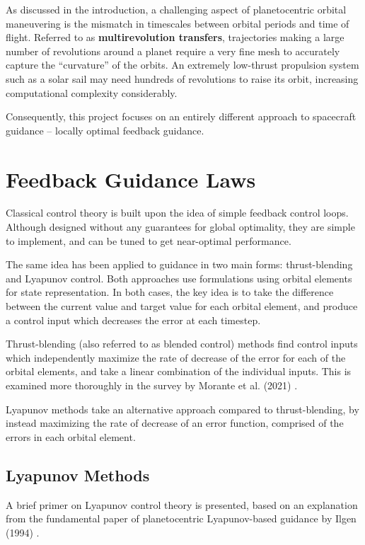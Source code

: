 As discussed in the introduction, a challenging aspect of planetocentric orbital maneuvering is the mismatch in timescales between orbital periods and time of flight. Referred to as \textbf{multirevolution transfers}, trajectories making a large number of revolutions around a planet require a very fine mesh to accurately capture the ``curvature'' of the orbits. An extremely low-thrust propulsion system such as a solar sail may need hundreds of revolutions to raise its orbit, increasing computational complexity considerably.

Consequently, this project focuses on an entirely different approach to spacecraft guidance -- locally optimal feedback guidance.

\section{Feedback Guidance Laws}
Classical control theory is built upon the idea of simple feedback control loops. Although designed without any guarantees for global optimality, they are simple to implement, and can be tuned to get near-optimal performance.

The same idea has been applied to guidance in two main forms: thrust-blending and Lyapunov control. Both approaches use formulations using orbital elements for state representation. In both cases, the key idea is to take the difference between the current value and target value for each orbital element, and produce a control input which decreases the error at each timestep.

Thrust-blending (also referred to as blended control) methods find control inputs which independently maximize the rate of decrease of the error for each of the orbital elements, and take a linear combination of the individual inputs. This is examined more thoroughly in the survey by Morante et al. (2021) \cite{morante2021survey}.

Lyapunov methods take an alternative approach compared to thrust-blending, by instead maximizing the rate of decrease of an error function, comprised of the errors in each orbital element.

\subsection{Lyapunov Methods}
A brief primer on Lyapunov control theory is presented, based on an explanation from the fundamental paper of planetocentric Lyapunov-based guidance by Ilgen (1994) \cite{ilgen1994low}.

